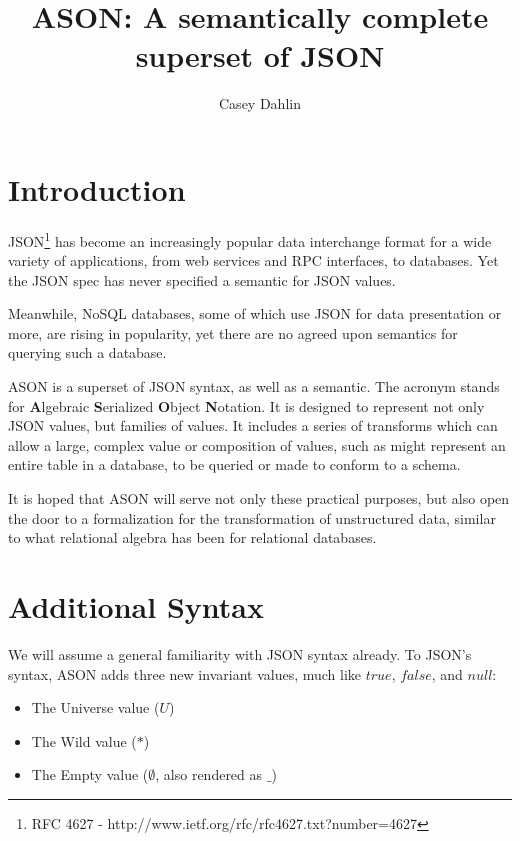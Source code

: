 \documentclass[letterpaper]{article}
\title{ASON: A semantically complete superset of JSON}
\author{Casey Dahlin}
\begin{document}
\setlength{\parskip}{1em}
\setlength{\parindent}{0em}
\newtheorem{prule}{Rule}
\newcommand{\kvpair}[2]{``#1":\quad#2,\quad}
\newcommand{\kvpaire}[2]{``#1":\quad#2}

\maketitle

\section{Introduction}
JSON\footnote{RFC 4627 - http://www.ietf.org/rfc/rfc4627.txt?number=4627} has
become an increasingly popular data interchange format for a wide variety of
applications, from web services and RPC interfaces, to databases. Yet the JSON
spec has never specified a semantic for JSON values.

Meanwhile, NoSQL databases, some of which use JSON for data presentation or
more, are rising in popularity, yet there are no agreed upon semantics for
querying such a database.

ASON is a superset of JSON syntax, as well as a semantic. The acronym stands
for \textbf{A}lgebraic \textbf{S}erialized \textbf{O}bject \textbf{N}otation.
It is designed to represent not only JSON values, but families of values. It
includes a series of transforms which can allow a large, complex value or
composition of values, such as might represent an entire table in a database,
to be queried or made to conform to a schema.

It is hoped that ASON will serve not only these practical purposes, but also
open the door to a formalization for the transformation of unstructured data,
similar to what relational algebra has been for relational databases.

\section{Additional Syntax}
\begin{samepage}
We will assume a general familiarity with JSON syntax already. To JSON's
syntax, ASON adds three new invariant values, much like \(true\), \(false\),
and \(null\):

\begin{itemize}
	\item The Universe value (\(U\))
	\item The Wild value (\(*\))
	\item The Empty value (\(\emptyset\), also rendered as \(\_\))
\end{itemize}
\end{samepage}
\end{document}
